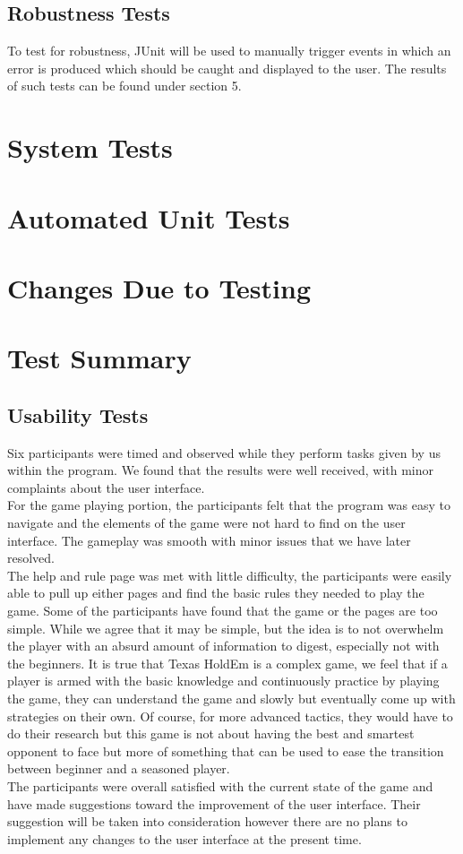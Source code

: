 \documentclass[11pt]{article}
\begin{document}
	\subsection{Robustness Tests}
	To test for robustness, JUnit will be used to manually trigger events in which an error is produced which should be caught and displayed to the user. The results of such tests can be found under section 5.
	
	\section{System Tests}
	\section{Automated Unit Tests}	
	\section{Changes Due to Testing}
	\section{Test Summary}
	\subsection{Usability Tests}
	Six participants were timed and observed while they perform tasks given by us within the program. We found that the results were well received, with minor complaints about the user interface. \\
	\newline
	For the game playing portion, the participants felt that the program was easy to navigate and the elements of the game were not hard to find on the user interface. The gameplay was smooth with minor issues that we have later resolved. \\
	\newline
	The help and rule page was met with little difficulty, the participants were easily able to pull up either pages and find the basic rules they needed to play the game. Some of the participants have found that the game or the pages are too simple. While we agree that it may be simple, but the idea is to not overwhelm the player with an absurd amount of information to digest, especially not with the beginners. It is true that Texas HoldEm is a complex game, we feel that if a player is armed with the basic knowledge and continuously practice by playing the game, they can understand the game and slowly but eventually come up with strategies on their own. Of course, for more advanced tactics, they would have to do their research but this game is not about having the best and smartest opponent to face but more of something that can be used to ease the transition between beginner and a seasoned player. \\
	\newline 
	The participants were overall satisfied with the current state of the game and have made suggestions toward the improvement of the user interface. Their suggestion will be taken into consideration however there are no plans to implement any changes to the user interface at the present time.
\end{document}
